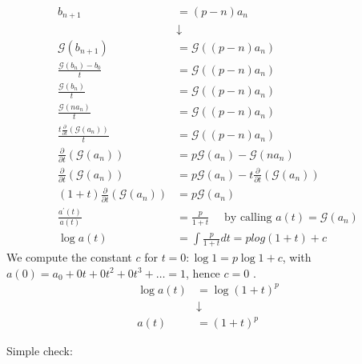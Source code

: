 \begin{displaymath}
  \begin{split}
    b_{n+1} &= (p-n)a_n \\
    &\downarrow \\
    \mathcal{G} (b_{n+1}) &= \mathcal{G} ((p-n)a_n)\\
    \frac{\mathcal{G} (b_n) - b_0}{t} &= \mathcal{G} ((p-n)a_n)\\
    \frac{\mathcal{G} (b_n)}{t} &= \mathcal{G} ((p-n)a_n)\\
    \frac{\mathcal{G} (n a_n)}{t} &= \mathcal{G} ((p-n)a_n)\\
    \frac{t\frac{\partial}{\partial t}\left( \mathcal{G} (a_n)
      \right) }{t} &= \mathcal{G} ((p-n)a_n)\\
    \frac{\partial}{\partial t}\left( \mathcal{G} (a_n) \right) &=
    p\mathcal{G} (a_n) - \mathcal{G} (n a_n)\\
    \frac{\partial}{\partial t}\left( \mathcal{G} (a_n) \right) &=
    p\mathcal{G} (a_n) - t \frac{\partial}{\partial t}\left(
      \mathcal{G} (a_n) \right)\\
    (1+t)\frac{\partial}{\partial t}\left( \mathcal{G} (a_n) \right)
    &=    p\mathcal{G} (a_n) \\
    \frac{a^\prime(t)}{a(t)} &= \frac{p}{1+t} \quad \text{ by calling
    }
    a(t) = \mathcal{G} (a_n)\\
    \log a(t) &= \int{ \frac{p}{1+t}dt} = p log{(1+t)} + c
  \end{split}
\end{displaymath}
We compute the constant $c$ for $t=0: \log 1 = p \log 1 + c$, with
$a(0) = a_0 + 0t+0t^2 + 0t^3+\ldots = 1$, hence $c=0$ .
\begin{displaymath}
  \begin{split}
    \log{a(t)} &= \log{(1+t)}^p\\
    &\downarrow \\
    a(t) &= (1+t)^p
  \end{split}
\end{displaymath}

Simple check:


